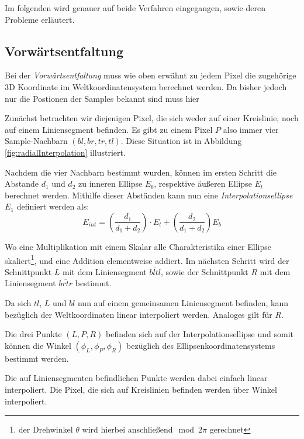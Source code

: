 Im folgenden wird genauer auf beide Verfahren eingegangen, sowie deren Probleme erläutert. 

\subsection{Vorwärtsentfaltung}
Bei der \textit{Vorwärtsentfaltung} muss wie oben erwähnt zu jedem Pixel die zugehörige 3D Koordinate im Weltkoordinatensystem berechnet werden. Da bisher jedoch nur die Postionen der Samples bekannt sind muss hier 

Zunächst betrachten wir diejenigen Pixel, die sich weder auf einer Kreislinie, noch auf einem Liniensegment befinden. Es gibt zu einem Pixel $P$ also immer vier Sample-Nachbarn $(bl, br, tr, tl)$. Diese Situation ist in Abbildung \ref{fig:radialInterpolation} illustriert. 

Nachdem die vier Nachbarn bestimmt wurden, können im ersten Schritt die Abstande $d_1$ und $d_2$ zu inneren Ellipse $E_b$, respektive äußeren Ellipse $E_t$ berechnet werden. Mithilfe dieser Abständen kann nun eine \textit{Interpolationsellipse}~$E_1$ definiert werden als:
\begin{equation*}
	E_{int} = \left(\frac{d_1}{d_1 + d_2}\right) \cdot E_t + \left(\frac{d_2}{d_1 + d_2}\right) E_b
\end{equation*}

Wo eine Multiplikation mit einem Skalar alle Charakteristika einer Ellipse skaliert\footnote{der Drehwinkel $\theta$ wird hierbei anschließend$\mod 2\pi$ gerechnet}, und eine Addition elementweise addiert. Im nächsten Schritt wird der Schnittpunkt $L$ mit dem Liniensegment $\overline{bltl}$, sowie der Schnittpunkt $R$ mit dem Liniensegment $\overline{brtr}$ bestimmt. 

Da sich $tl$, $L$ und $bl$ nun auf einem gemeinsamen Liniensegment befinden, kann bezüglich der Weltkoordinaten linear interpoliert werden. Analoges gilt für $R$. 

Die drei Punkte $(L,P, R)$ befinden sich auf der Interpolationsellipse und somit können die  Winkel $(\phi_L, \phi_P, \phi_R)$ bezüglich des Ellipsenkoordinatensystems bestimmt werden. 


Die auf Liniensegmenten befindlichen Punkte werden dabei einfach linear interpoliert. Die Pixel, die sich auf Kreislinien befinden werden über Winkel interpoliert. 

